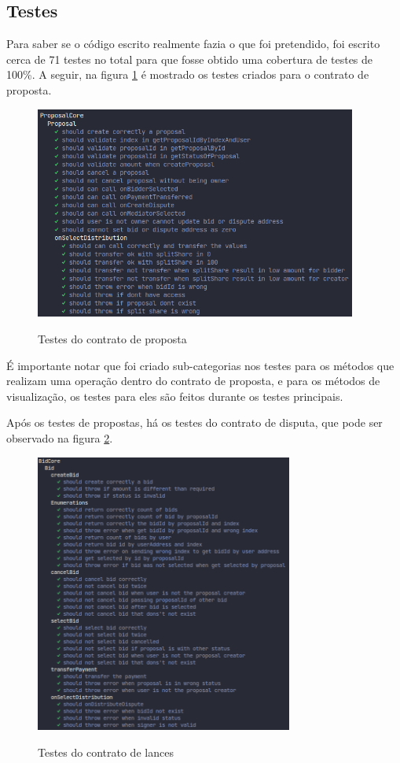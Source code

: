 \subsection{Testes}

Para saber se o código escrito realmente fazia o que foi pretendido, foi escrito cerca de 71 testes no total para que fosse obtido uma cobertura de testes de 100\%. 
A seguir, na figura \ref{fig:tests_proposal_fig} é mostrado os testes criados para o contrato de proposta.

\begin{figure}[!h]
  \centering
  \caption{Testes do contrato de proposta}
  \includegraphics[width=400px]{src/images/contracts/tests_proposal.png}
  \label{fig:tests_proposal_fig}
\end{figure}

É importante notar que foi criado sub-categorias nos testes para os métodos que realizam uma operação dentro do contrato de proposta, e para os métodos de visualização, os testes para eles são feitos durante os testes principais.

Após os testes de propostas, há os testes do contrato de disputa, que pode ser observado na figura \ref{fig:tests_bid_fig}.

\begin{figure}[!h]
  \centering
  \caption{Testes do contrato de lances}
  \includegraphics[width=320px]{src/images/contracts/tests_bid.png}
  \label{fig:tests_bid_fig}
\end{figure}

